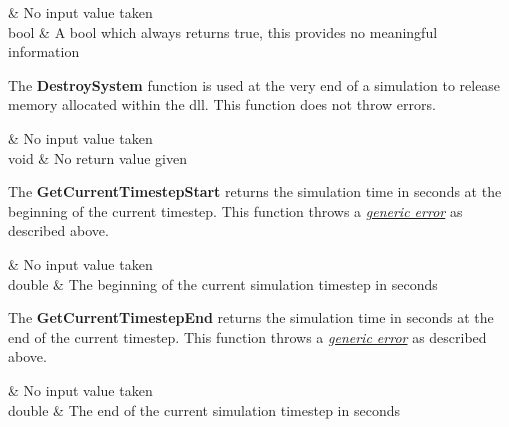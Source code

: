     {
             & No input value taken\\
    }{
        bool & A bool which always returns true, this provides no meaningful information\\
    }

%

    \hspace{\parindent}\unclass The \textcolor{red5}{\textbf{DestroySystem}} function is used at the very end of a simulation to release memory allocated within the \gls{dll}. This function does not throw errors.

    {
             & No input value taken\\
    }{
        void & No return value given\\
    }

%

    \hspace{\parindent}\unclass The \textcolor{red5}{\textbf{GetCurrentTimestepStart}} returns the simulation time in seconds at the beginning of the current timestep. This function throws a \hyperlink{genericerror}{\textit{generic error}} as described above.

    {
               & No input value taken\\
    }{
        double & The beginning of the current simulation timestep in seconds\\
    }
%
%

    \hspace{\parindent}\unclass The \textcolor{red5}{\textbf{GetCurrentTimestepEnd}} returns the simulation time in seconds at the end of the current timestep. This function throws a \hyperlink{genericerror}{\textit{generic error}} as described above.

    {
               & No input value taken\\
    }{
        double & The end of the current simulation timestep in seconds\\
    }
%
%

